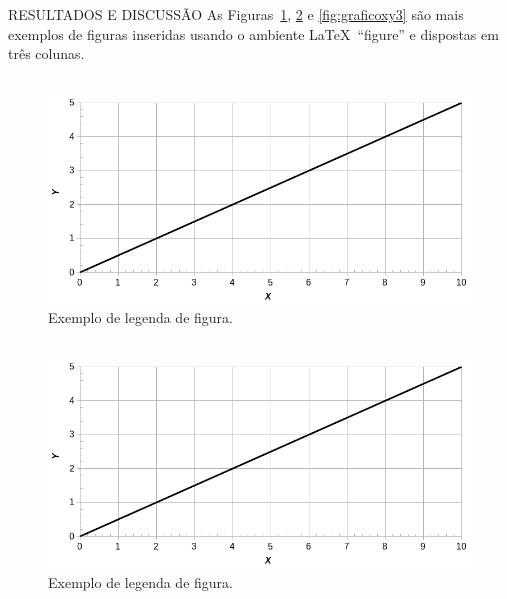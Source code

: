 \documentclass[final]{beamer}
\begin{document}
\begin{frame}[t, fragile = singleslide]{}
\begin{columns}[t]
\begin{column}{0.45\textwidth}
\end{column}

\end{columns}

\begin{columns}[t]

\begin{column}{0.945\textwidth}

\begin{block}{RESULTADOS E DISCUSSÃO}
As Figuras~\ref{fig:graficoxy1}, \ref{fig:graficoxy2} e \ref{fig:graficoxy3} são mais exemplos de figuras inseridas usando o ambiente \LaTeX\ ``figure'' e dispostas em três colunas.
\begin{column}[T]{0.33\textwidth}
\begin{figure}[!htb]
\centering
\caption{Exemplo de legenda de figura.}
\label{fig:graficoxy1}
\includegraphics[width = 0.75\columnwidth]{./Figuras/graficoxy}
\end{figure}
\end{column}
{\color{tsinghua}\vrule width 1.5pt}
\begin{column}[T]{0.33\textwidth}
\begin{figure}[!htb]
\centering
\caption{Exemplo de legenda de figura.}
\label{fig:graficoxy2}
\includegraphics[width = 0.75\columnwidth]{./Figuras/graficoxy}
\end{figure}
\end{column}
{\color{tsinghua}\vrule width 1.5pt}
\begin{column}[T]{0.33\textwidth}

\end{column}
\end{block}
\end{column}
\end{columns}
\end{frame}
\end{document}
